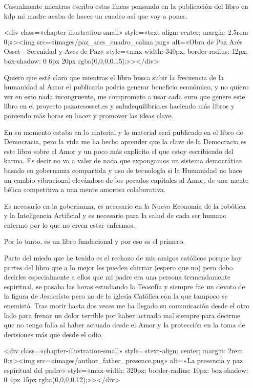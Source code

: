 \documentclass[11pt,a5paper]{book}
\begin{document}
Casualmente mientras escribo estas líneas pensando en la publicación del libro en kdp mi madre acaba de hacer un cuadro así que voy a poner.

<div class=«chapter-illustration-small» style=«text-align: center; margin: 2.5rem 0;»><img src=«images/paz_ares_cuadro_calma.png» alt=«Obra de Paz Arés Osset - Serenidad y Aves de Paz» style=«max-width: 340px; border-radius: 12px; box-shadow: 0 6px 20px rgba(0,0,0,0.15);»></div>

Quiero que esté claro que mientras el libro busca subir la frecuencia de la humanidad al Amor el publicarlo podría generar beneficio económico, y no quiero ver en esto nada incongruente, me comprometo a usar cada euro que genere este libro en el proyecto pazaresosset.es y saludequilibrio.es haciendo más libros y poniendo más horas en hacer y promover las ideas clave.

En su momento estaba en lo material y lo material será publicado en el libro de Democracia, pero la vida me ha hecho aprender que la clave de la Democracia es este libro sobre el Amor y un poco más explícito el que estoy escribiendo del karma. Es decir no va a valer de nada que expongamos un sistema democrático basado en gobernanza compartida y uso de tecnología si la Humanidad no hace un cambio vibracional elevándose de los pecados capitales al Amor, de una mente bélica competitiva a una mente amorosa colaborativa.

Es necesario en la gobernanza, es necesario en la Nueva Economía de la robótica y la Inteligencia Artificial y es necesario para la salud de cada ser humano enfermo por lo que no creen estar enfermos.

Por lo tanto, es un libro fundacional y por eso es el primero.

Parte del miedo que he tenido es el rechazo de mis amigos católicos porque hay partes del libro que a lo mejor les pueden chirriar (espero que no) pero debo decirles especialmente a ellos que mi padre era una persona tremendamente espiritual, se pasaba las horas estudiando la Teosofía y siempre fue un devoto de la figura de Jesucristo pero no de la iglesia Católica con la que tampoco se enemistó. Tras morir hasta dos veces me ha llegado su comunicación desde el otro lado para frenar un dolor terrible por haber actuado mal siempre para decirme que no tengo falla al haber actuado desde el Amor y la protección en la toma de decisiones más que desde el odio. 

<div class=«chapter-illustration-small» style=«text-align: center; margin: 2rem 0;»><img src=«images/author_father_presence.png» alt=«La presencia y paz espiritual del padre» style=«max-width: 320px; border-radius: 10px; box-shadow: 0 4px 15px rgba(0,0,0,0.12);»></div>
\end{document}
